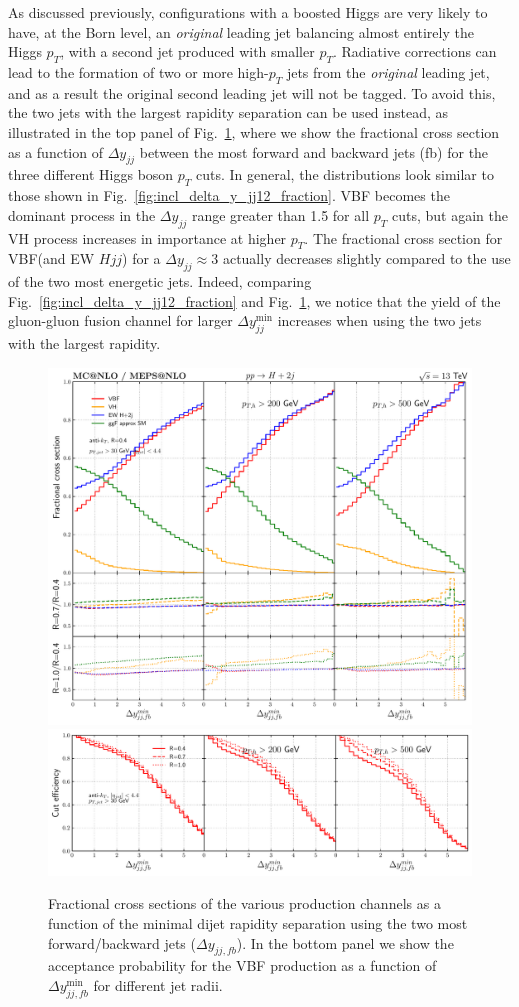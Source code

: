 \documentclass[10pt,prd,fleqn,superscriptaddress,notitlepage,nofootinbib,preprintnumbers,nobalancelastpage]{revtex4-1}
\newcommand{\VBF}{VBF\xspace}
\newcommand{\VH}{VH\xspace}
\begin{document}
As discussed previously, configurations with a boosted Higgs are very likely to have, at the Born level, an {\it original} leading jet balancing almost entirely the Higgs $p_T$, with a second jet produced with smaller $p_T$. Radiative corrections can lead to the formation of two or more high-$p_T$ jets from the {\it original} leading jet, and as a result the {\it} original second leading jet will not be tagged. To avoid this,  the two jets with the largest rapidity separation can be used instead, as illustrated in the top panel of Fig.~\ref{fig:incl_delta_y_jj12_fraction_fb}, where we show the fractional cross section  as a function of $\Delta y_{jj}$ between the most forward and backward jets (fb)  for the three different Higgs boson $p_T$ cuts. In general, the distributions look  similar to those shown in Fig.~\ref{fig:incl_delta_y_jj12_fraction}. \VBF becomes the dominant process in the $\Delta y_{jj}$ range greater than 1.5 for all $p_T$ cuts, but again  the \VH process increases in importance at higher $p_T$. The fractional cross section for \VBF (and EW $Hjj$) for a $\Delta y_{jj} \approx 3$ actually decreases slightly compared to the use of the two most energetic jets.
Indeed, comparing Fig.~\ref{fig:incl_delta_y_jj12_fraction} and Fig.~\ref{fig:incl_delta_y_jj12_fraction_fb}, we notice that the yield of the gluon-gluon fusion channel for larger $\Delta y_{jj}^{\min}$ increases when using the two jets with the largest rapidity.


\begin{figure}[t]
  \centering
  \includegraphics[width=.65\textwidth]{figures/vbf/delta_y_jjfb.pdf}
  \includegraphics[width=.65\textwidth]{figures/vbf/delta_y_jjfb_frac.pdf}
\caption{Fractional cross sections of the various production channels as a function of the minimal dijet rapidity separation using the two most forward/backward jets ($\Delta y_{jj,fb}$).
In the bottom panel we show the acceptance probability for the \VBF{} production as a function of $\Delta y_{jj,fb}^{\min}$ for different jet radii.
}
\label{fig:incl_delta_y_jj12_fraction_fb}
\end{figure}
\end{document}
